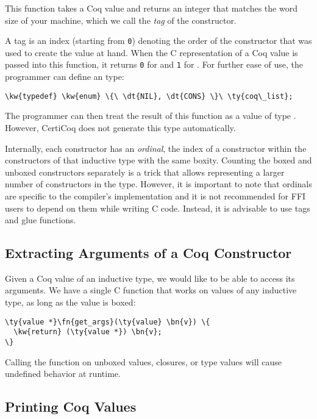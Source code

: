 This function takes a Coq value and returns an integer that matches the word size of your machine, which we call the \emph{\gls{tag}} of the constructor.

A tag is an index (starting from \texttt{0}) denoting the order of the
constructor that was used to create the value at hand. When the C
representation of a Coq value is passed into this function, it returns
\texttt{0} for  and \texttt{1} for . For
further ease of use, the programmer can define an  type:
\begin{Verbatim}
\kw{typedef} \kw{enum} \{\ \dt{NIL}, \dt{CONS} \}\ \ty{coq\_list};
\end{Verbatim}
The programmer can then treat the result of this function as a value of type . However, CertiCoq does not generate this type automatically.

Internally, each constructor has an \emph{\gls{ordinal}}, the index of a constructor within the constructors of that \gls{inductive type} with the same \gls{boxity}. Counting the \gls{boxed} and \gls{unboxed} constructors separately is a trick that allows representing a larger number of constructors in the  type. However, it is important to note that ordinals are specific to the compiler's implementation and it is not recommended for FFI users to depend on them while writing C code. Instead, it is advisable to use \gls{tag}s and glue functions.

\subsection{Extracting Arguments of a Coq Constructor} 

Given a Coq value of an \gls{inductive type}, we would like to be able to access its \constructor{} arguments. We have a single C function that works on values of any \gls{inductive type}, as long as the value is \gls{boxed}:

\begin{Verbatim}
\ty{value *}\fn{get_args}(\ty{value} \bn{v}) \{
  \kw{return} (\ty{value *}) \bn{v};
\}
\end{Verbatim}

Calling the  function on \gls{unboxed} values, \gls{closure}s, or type values will cause undefined behavior at runtime.

\subsection{Printing Coq Values}

